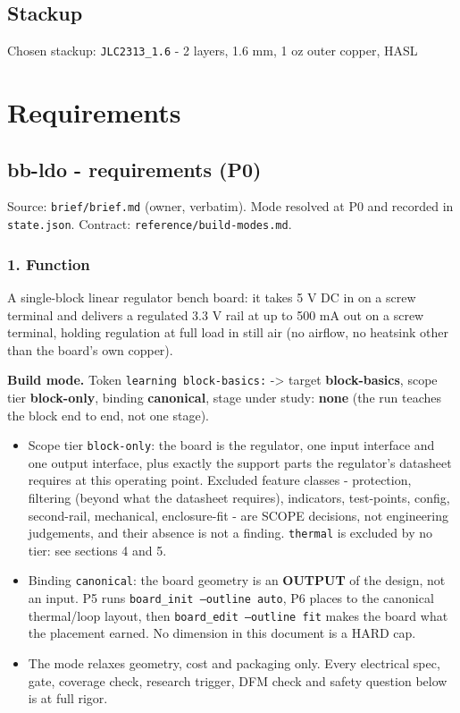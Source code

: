 \documentclass[11pt,a4paper]{article}
\begin{document}
\subsection*{Stackup}
Chosen stackup: \texttt{JLC2313\_1.6} - 2 layers, 1.6 mm, 1 oz outer copper, HASL
\section{Requirements}
\subsection*{bb-ldo - requirements (P0)}
Source: \texttt{brief/brief.md} (owner, verbatim). Mode resolved at P0 and recorded in \texttt{state.json}. Contract: \texttt{reference/build-modes.md}.

\subsubsection*{1. Function}
A single-block linear regulator bench board: it takes 5 V DC in on a screw terminal and delivers a regulated 3.3 V rail at up to 500 mA out on a screw terminal, holding regulation at full load in still air (no airflow, no heatsink other than the board's own copper).

\textbf{Build mode.} Token \texttt{learning block-basics:} -\textgreater{} target \textbf{block-basics}, scope tier \textbf{block-only}, binding \textbf{canonical}, stage under study: \textbf{none} (the run teaches the block end to end, not one stage).

\begin{itemize}
\item Scope tier \texttt{block-only}: the board is the regulator, one input interface and
one output interface, plus exactly the support parts the regulator's
datasheet requires at this operating point. Excluded feature classes -
protection, filtering (beyond what the datasheet requires), indicators,
test-points, config, second-rail, mechanical, enclosure-fit - are SCOPE
decisions, not engineering judgements, and their absence is not a finding.
\texttt{thermal} is excluded by no tier: see sections 4 and 5.
\item Binding \texttt{canonical}: the board geometry is an \textbf{OUTPUT} of the design, not
an input. P5 runs \texttt{board\_init --outline auto}, P6 places to the canonical
thermal/loop layout, then \texttt{board\_edit --outline fit} makes the board what
the placement earned. No dimension in this document is a HARD cap.
\item The mode relaxes geometry, cost and packaging only. Every electrical spec,
gate, coverage check, research trigger, DFM check and safety question below
is at full rigor.
\end{itemize}
\end{document}
